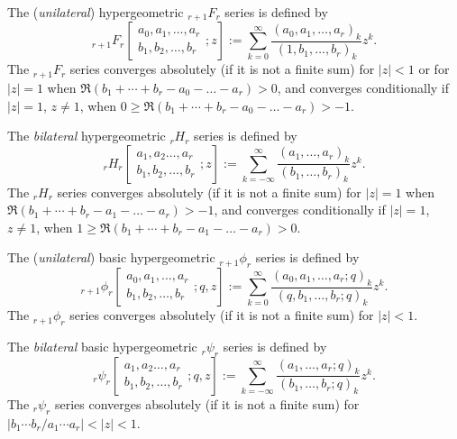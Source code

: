 \documentclass[reqno,12pt]{amsart}
\theoremstyle{remark}
\numberwithin{equation}{section}
\begin{document}
The (\textit{unilateral}) hypergeometric ${}_{r+1}F_r$ series
is defined by
\begin{equation}
{}_{r+1}F_r\!\left[\begin{matrix}a_0,a_1,\dots,a_r\\
b_1,b_2,\dots,b_r\end{matrix};z\right]
:=\sum_{k=0}^{\infty}\frac{(a_0,a_1,\dots,a_r)_k}
{(1,b_1,\dots,b_r)_k}z^k.
\end{equation}
The $_{r+1}F_r$ series  converges absolutely (if it is not a finite sum)
for $|z|<1$ or for $|z|=1$ when
$\Re(b_1+\cdots+b_r-a_0-\ldots-a_r) >0$,
and converges conditionally if $|z|=1$, $z\neq 1$, when
$0\ge \Re(b_1+\cdots+b_r-a_0-\ldots-a_r)>-1$.

The \textit{bilateral} hypergeometric ${}_rH_r$ series
is defined by
\begin{equation*}
{}_rH_r\!\left[\begin{matrix}a_1,a_2\dots,a_r\\
b_1,b_2,\dots,b_r\end{matrix};z\right]
:=\sum_{k=-\infty}^{\infty}\frac{(a_1,\dots,a_r)_k}
{(b_1,\dots,b_r)_k}z^k.
\end{equation*}
The $_rH_r$ series converges absolutely (if it is not a finite sum)
for $|z|=1$ when $\Re(b_1+\cdots+b_r-a_1-\ldots-a_r) >-1$,
and converges conditionally if $|z|=1$, $z\neq 1$, when
$1\ge \Re(b_1+\cdots+b_r-a_1-\ldots-a_r)>0$.

The (\textit{unilateral}) basic hypergeometric
${}_{r+1}\phi_r$ series is defined by
\begin{equation*}
{}_{r+1}\phi_r\!\left[\begin{matrix}a_0,a_1,\dots,a_r\\
b_1,b_2,\dots,b_r\end{matrix};q,z\right]
:=\sum_{k=0}^{\infty}\frac{(a_0,a_1,\dots,a_r;q)_k}
{(q,b_1,\dots,b_r;q)_k}z^k.
\end{equation*}
The ${}_{r+1}\phi_r$ series converges absolutely
(if it is not a finite sum) for $|z|<1$.

The \textit{bilateral} basic hypergeometric
${}_r\psi_r$ series is defined by
\begin{equation*}
{}_r\psi_r\!\left[\begin{matrix}a_1,a_2\dots,a_r\\
b_1,b_2,\dots,b_r\end{matrix};q,z\right]
:=\sum_{k=-\infty}^{\infty}\frac{(a_1,\dots,a_r;q)_k}
{(b_1,\dots,b_r;q)_k}z^k.
\end{equation*}
The ${}_r\psi_r$ series converges absolutely (if it is not a finite sum)
for $|b_1\cdots b_r/a_1\cdots a_r|<|z|<1$.
\end{document}

